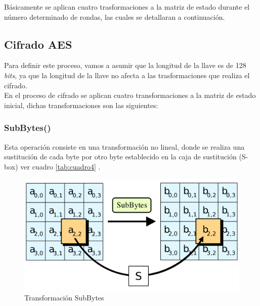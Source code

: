 \documentclass[peerreview]{IEEEtran}
\begin{document}
Básicamente se aplican cuatro trasformaciones a la matriz de estado durante el
número determinado de rondas, las cuales se detallaran a continuación.
\subsection{Cifrado AES}
Para definir este proceso, vamos a asumir que la longitud de la llave es de 128 \textit{bits}, ya que la longitud de la llave no afecta a las trasformaciones que realiza el cifrado.\\ 
En el proceso de cifrado se aplican cuatro transformaciones a la matriz de estado inicial, dichas transformaciones son las siguientes:\\

\subsubsection{SubBytes()}
Esta operación consiste en una transformación no lineal, donde se realiza una
sustitución de cada byte por otro byte establecido en la caja de sustitución
(S-box) ver cuadro \ref{tab:cuadro4} .\\

\begin{figure}[h!]
  \includegraphics[scale=0.1]{figuras/SubBytes.png}
  \centering
  \caption{Transformación SubBytes}
  \label{fig: 3}
\end{figure}
\end{document}
